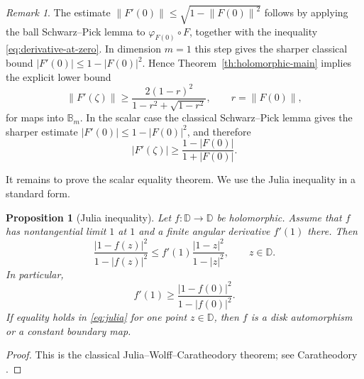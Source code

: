 \documentclass[11pt]{amsart}
\newtheorem{proposition}[theorem]{Proposition}
\theoremstyle{definition}
\theoremstyle{remark}
\newtheorem{remark}[theorem]{Remark}
\newcommand{\D}{\mathbb D}
\newcommand{\B}{\mathbb B}
\newcommand{\norm}[1]{\left\|#1\right\|}
\begin{document}
\begin{remark}\label{rem:explicit-noncentered}
The estimate \(\norm{F'(0)}\le\sqrt{1-\norm{F(0)}^2}\) follows by applying the ball Schwarz--Pick lemma to \(\varphi_{F(0)}\circ F\), together with the inequality \eqref{eq:derivative-at-zero}. In dimension \(m=1\) this step gives the sharper classical bound \(|F'(0)|\le1-|F(0)|^2\). Hence Theorem~\ref{th:holomorphic-main} implies the explicit lower bound
\[
        \norm{F'(\zeta)}
        \ge
        \frac{2(1-r)^2}{1-r^2+\sqrt{1-r^2}},
        \qquad r=\norm{F(0)},
\]
for maps into \(\B_m\). In the scalar case the classical Schwarz--Pick lemma gives the sharper estimate \(|F'(0)|\le1-|F(0)|^2\), and therefore
\[
        |F'(\zeta)|\ge\frac{1-|F(0)|}{1+|F(0)|}.
\]
\end{remark}

It remains to prove the scalar equality theorem. We use the Julia inequality in a standard form.

\begin{proposition}[Julia inequality]\label{prop:julia}
Let \(f:\D\to\D\) be holomorphic. Assume that \(f\) has nontangential limit \(1\) at \(1\) and a finite angular derivative \(f'(1)\) there. Then
\begin{equation}\label{eq:julia}
        \frac{|1-f(z)|^2}{1-|f(z)|^2}
        \le
        f'(1)\frac{|1-z|^2}{1-|z|^2},
        \qquad z\in\D.
\end{equation}
In particular,
\[
        f'(1)\ge \frac{|1-f(0)|^2}{1-|f(0)|^2}.
\]
If equality holds in \eqref{eq:julia} for one point \(z\in\D\), then \(f\) is a disk automorphism or a constant boundary map.
\end{proposition}

\begin{proof}
This is the classical Julia--Wolff--Caratheodory theorem; see Caratheodory \cite[p.~27]{JuliaCar}.
\end{proof}
\end{document}
